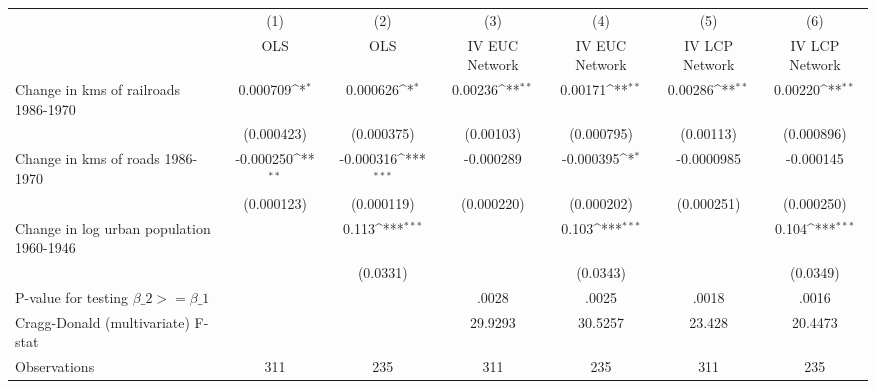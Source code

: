 {
\def\sym#1{\ifmmode^{#1}\else\(^{#1}\)\fi}
\begin{tabular}{l*{6}{c}}
\hline\hline
                &\multicolumn{1}{c}{(1)}&\multicolumn{1}{c}{(2)}&\multicolumn{1}{c}{(3)}&\multicolumn{1}{c}{(4)}&\multicolumn{1}{c}{(5)}&\multicolumn{1}{c}{(6)}\\
                &\multicolumn{1}{c}{OLS}&\multicolumn{1}{c}{OLS}&\multicolumn{1}{c}{IV EUC Network}&\multicolumn{1}{c}{IV EUC Network}&\multicolumn{1}{c}{IV LCP Network}&\multicolumn{1}{c}{IV LCP Network}\\
\hline
Change in kms of railroads 1986-1970& 0.000709\sym{*}  & 0.000626\sym{*}  &  0.00236\sym{**} &  0.00171\sym{**} &  0.00286\sym{**} &  0.00220\sym{**} \\
                &(0.000423)         &(0.000375)         &(0.00103)         &(0.000795)         &(0.00113)         &(0.000896)         \\
[1em]
Change in kms of roads 1986-1970&-0.000250\sym{**} &-0.000316\sym{***}&-0.000289         &-0.000395\sym{*}  &-0.0000985         &-0.000145         \\
                &(0.000123)         &(0.000119)         &(0.000220)         &(0.000202)         &(0.000251)         &(0.000250)         \\
[1em]
Change in log urban population 1960-1946&                  &    0.113\sym{***}&                  &    0.103\sym{***}&                  &    0.104\sym{***}\\
                &                  & (0.0331)         &                  & (0.0343)         &                  & (0.0349)         \\
\hline
P-value for testing $\beta\_{2} >= \beta\_{1}$&                  &                  &    .0028         &    .0025         &    .0018         &    .0016         \\
Cragg-Donald (multivariate) F-stat&                  &                  &  29.9293         &  30.5257         &   23.428         &  20.4473         \\
Observations    &      311         &      235         &      311         &      235         &      311         &      235         \\
\hline\hline
\end{tabular}
}
